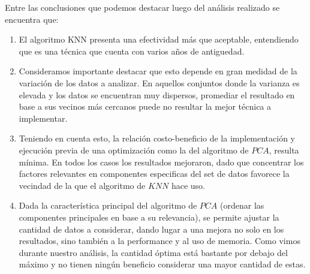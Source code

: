 Entre las conclusiones que podemos destacar luego del análisis realizado se encuentra que:

\begin{enumerate}
 \item El algoritmo KNN presenta una efectividad más que aceptable, entendiendo que es una técnica que cuenta con varios años de antiguedad.
 \item Consideramos importante destacar que esto depende en gran medidad de la variación de los datos a analizar. En aquellos conjuntos donde la varianza es elevada y los datos se encuentran muy dispersos, promediar el resultado en base a sus vecinos más cercanos puede no resultar la mejor técnica a implementar.
 \item Teniendo en cuenta esto, la relación costo-beneficio de la implementación y ejecución previa de una optimización como la del algoritmo de $PCA$, resulta mínima. En todos los casos los resultados mejoraron, dado que concentrar los factores relevantes en componentes especificas del set de datos favorece la vecindad de la que el algoritmo de $KNN$ hace uso.
 \item Dada la característica principal del algoritmo de $PCA$ (ordenar las componentes principales en base a su relevancia), se permite ajustar la cantidad de datos a considerar, dando lugar a una mejora no solo en los resultados, sino también a la performance y al uso de memoria. Como vimos durante nuestro análisis, la cantidad óptima está bastante por debajo del máximo y no tienen ningún beneficio considerar una mayor cantidad de estas.
\end{enumerate}
